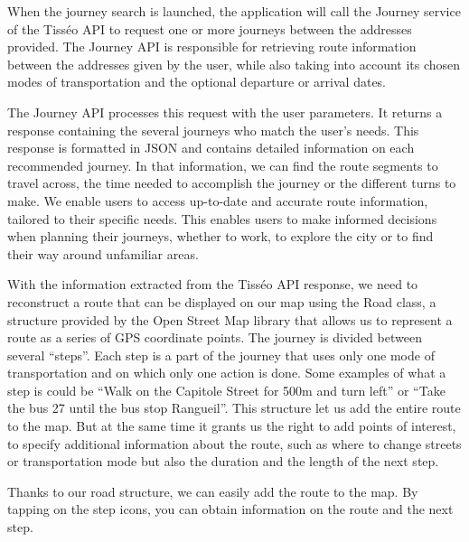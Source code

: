 When the journey search is launched, the application will call the Journey service of the Tisséo API to request one or more journeys between the addresses provided. The Journey API is responsible for retrieving route information between the addresses given by the user, while also taking into account its chosen modes of transportation and the optional departure or arrival dates.



The Journey API processes this request with the user parameters. It returns a response containing the several journeys who match the user's needs. This response is formatted in JSON and contains detailed information on each recommended journey. In that information, we can find the route segments to travel across, the time needed to accomplish the journey or the different turns to make. We enable users to access up-to-date and accurate route information, tailored to their specific needs. This enables users to make informed decisions when planning their journeys, whether to work, to explore the city or to find their way around unfamiliar areas.



With the information extracted from the Tisséo API response, we need to reconstruct a route that can be displayed on our map using the Road class, a structure provided by the Open Street Map library that allows us to represent a route as a series of GPS coordinate points. The journey is divided between several “steps”. Each step is a part of the journey that uses only one mode of transportation and on which only one action is done. Some examples of what a step is could be “Walk on the Capitole Street for 500m and turn left” or “Take the bus 27 until the bus stop Rangueil”. This structure let us add the entire route to the map. But at the same time it grants us the right to add points of interest, to specify additional information about the route, such as where to change streets or transportation mode but also the duration and the length of the next step.



Thanks to our road structure, we can easily add the route to the map. By tapping on the step icons, you can obtain information on the route and the next step.





